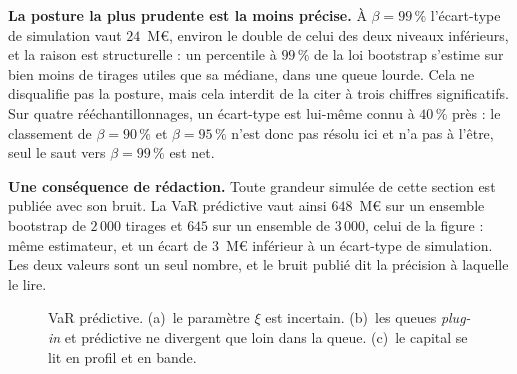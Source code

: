 \textbf{La posture la plus prudente est la moins précise.} À $\beta=99\,\%$ l'écart-type de
simulation vaut $24$~M\euro, environ le double de celui des deux niveaux inférieurs, et la raison
est structurelle : un percentile à $99\,\%$ de la loi bootstrap s'estime sur bien moins de
tirages utiles que sa médiane, dans une queue lourde. Cela ne disqualifie pas la posture, mais
cela interdit de la citer à trois chiffres significatifs. Sur quatre rééchantillonnages, un
écart-type est lui-même connu à $40\,\%$ près : le classement de $\beta=90\,\%$ et
$\beta=95\,\%$ n'est donc pas résolu ici et n'a pas à l'être, seul le saut vers $\beta=99\,\%$
est net.

\textbf{Une conséquence de rédaction.} Toute grandeur simulée de cette section est publiée avec son
bruit. La VaR prédictive vaut ainsi $648$~M\euro{} sur un ensemble bootstrap de $2\,000$ tirages et
$645$ sur un ensemble de $3\,000$, celui de la figure : même estimateur, et un écart de
$3$~M\euro{} inférieur à un écart-type de simulation. Les deux valeurs sont un seul nombre, et le
bruit publié dit la précision à laquelle le lire.

\begin{figure}[htbp]\centering
{}
\caption{VaR prédictive. (a)~le paramètre $\xi$ est incertain. (b)~les queues
\emph{plug-in} et prédictive ne divergent que loin dans la queue. (c)~le capital se lit
en profil et en bande.}
\label{fig:predictive}
\end{figure}
